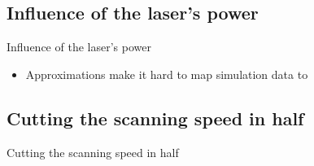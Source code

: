 \subsection{Influence of the laser's power}
\begin{frame}{Influence of the laser's power}
	\begin{itemize}
		\item Approximations make it hard to map simulation data to
	\end{itemize}
\end{frame}


\subsection{Cutting the scanning speed in half}
\begin{frame}{Cutting the scanning speed in half}
	\missing
\end{frame}
